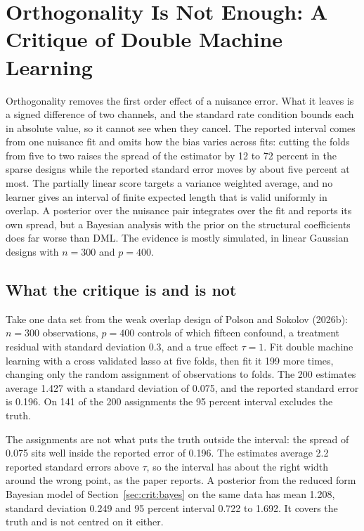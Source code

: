 \chapter[Orthogonality Is Not Enough]{Orthogonality Is Not Enough: A Critique of Double Machine Learning}\label{ch:critique}

\begin{tcolorbox}[colback=gray!6,colframe=gray!50,title=In brief,fonttitle=\normalfont\itshape,coltitle=black,colbacktitle=gray!15,boxrule=0.4pt,arc=1pt]
Orthogonality removes the first order effect of a nuisance error. What it leaves is a signed difference of two channels, and the standard rate condition bounds each in absolute value, so it cannot see when they cancel. The reported interval comes from one nuisance fit and omits how the bias varies across fits: cutting the folds from five to two raises the spread of the estimator by 12 to 72 percent in the sparse designs while the reported standard error moves by about five percent at most. The partially linear score targets a variance weighted average, and no learner gives an interval of finite expected length that is valid uniformly in overlap. A posterior over the nuisance pair integrates over the fit and reports its own spread, but a Bayesian analysis with the prior on the structural coefficients does far worse than DML. The evidence is mostly simulated, in linear Gaussian designs with $n = 300$ and $p = 400$.
\end{tcolorbox}

\section{What the critique is and is not}\label{sec:crit:what}

Take one data set from the weak overlap design of Polson and Sokolov (2026b): $n = 300$ observations, $p = 400$ controls of which fifteen confound, a treatment residual with standard deviation 0.3, and a true effect $\tau = 1$. Fit double machine learning with a cross validated lasso at five folds, then fit it 199 more times, changing only the random assignment of observations to folds. The 200 estimates average 1.427 with a standard deviation of 0.075, and the reported standard error is 0.196. On 141 of the 200 assignments the 95 percent interval excludes the truth.

The assignments are not what puts the truth outside the interval: the spread of 0.075 sits well inside the reported error of 0.196. The estimates average 2.2 reported standard errors above $\tau$, so the interval has about the right width around the wrong point, as the paper reports. A posterior from the reduced form Bayesian model of Section~\ref{sec:crit:bayes} on the same data has mean 1.208, standard deviation 0.249 and 95 percent interval 0.722 to 1.692. It covers the truth and is not centred on it either.

